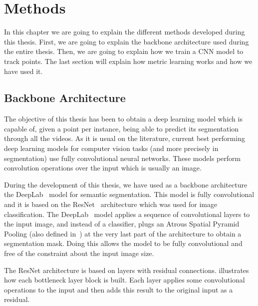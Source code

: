 
\chapter{Methods}
\label{cha:methods}

In this chapter we are going to explain the different methods developed during this thesis.
First, we are going to explain the backbone architecture used during the entire thesis.
Then, we are going to explain how we train a CNN model to track points.
The last section will explain how metric learning works and how we have used it.

\section{Backbone Architecture}
\label{sec:methods:backbonearchitecture}

The objective of this thesis has been to obtain a deep learning model which is capable of, given a point per instance, being able to predict its segmentation through all the videos.
As it is usual on the literature, current best performing deep learning models for computer vision tasks (and more precisely in segmentation) use fully convolutional neural networks.
These models perform convolution operations over the input which is usually an image.

During the development of this thesis, we have used as a backbone architecture the DeepLab~\deeplab{} model for semantic segmentation.
This model is fully convolutional and it is based on the ResNet~\resnet{} architecture which was used for image classification.
The DeepLab~\deeplab{} model applies a sequence of convolutional layers to the input image, and instead of a classifier, plugs an Atrous Spatial Pyramid Pooling (also defined in~\deeplab{}) at the very last part of the architecture to obtain a segmentation mask.
Doing this allows the model to be fully convolutional and free of the constraint about the input image size.

The ResNet architecture is based on layers with residual connections.
 illustrates how each bottleneck layer block is built.
Each layer applies some convolutional operations to the input and then adds this result to the original input as a residual.

